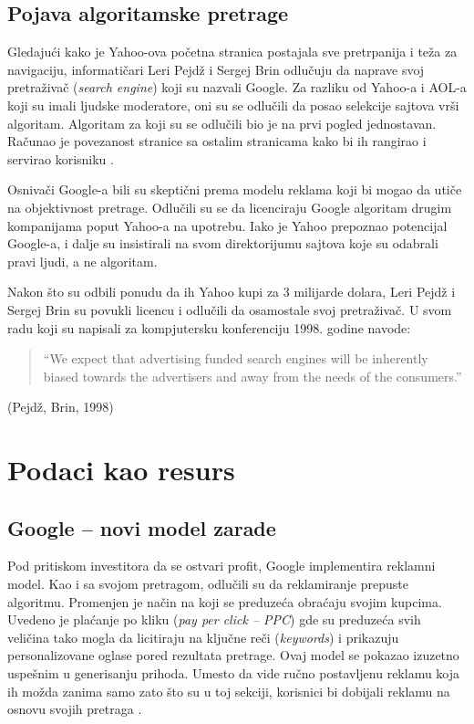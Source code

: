 \documentclass[12pt,a4paper]{article}
\begin{document}
\subsection{\textbf{Pojava algoritamske pretrage}}

Gledajući kako je Yahoo-ova početna stranica postajala sve pretrpanija i teža za navigaciju, informatičari Leri Pejdž i Sergej Brin odlučuju da naprave svoj pretraživač (\textit{search engine}) koji su nazvali Google. Za razliku od Yahoo-a i AOL-a koji su imali ljudske moderatore, oni su se odlučili da posao selekcije sajtova vrši algoritam. Algoritam za koji su se odlučili bio je na prvi pogled jednostavan. Računao je povezanost stranice sa ostalim stranicama kako bi ih rangirao i servirao korisniku \cite{google_marketing}.

Osnivači Google-a bili su skeptični prema modelu reklama koji bi mogao da utiče na objektivnost pretrage. Odlučili su se da licenciraju Google algoritam drugim kompanijama poput Yahoo-a na upotrebu. Iako je Yahoo prepoznao potencijal Google-a, i dalje su insistirali na svom direktorijumu sajtova koje su odabrali pravi ljudi, a ne algoritam.

Nakon što su odbili ponudu da ih Yahoo kupi za 3 milijarde dolara, Leri Pejdž i Sergej Brin su povukli licencu i odlučili da osamostale svoj pretraživač. U svom radu koji su napisali za kompjutersku konferenciju 1998. godine \cite{google_anatomy} navode:

\begin{quote}
``We expect that advertising funded search engines will be inherently biased towards the advertisers and away from the needs of the consumers.''
\end{quote}
\hfill (Pejdž, Brin, 1998)

\newpage

\section{Podaci kao resurs}
\subsection{\textbf{Google – novi model zarade}}

Pod pritiskom investitora da se ostvari profit, Google implementira reklamni model. Kao i sa svojom pretragom, odlučili su da reklamiranje prepuste algoritmu. Promenjen je način na koji se preduzeća obraćaju svojim kupcima. Uvedeno je plaćanje po kliku (\textit{pay per click – PPC}) gde su preduzeća svih veličina tako mogla da licitiraju na ključne reči (\textit{keywords}) i prikazuju personalizovane oglase pored rezultata pretrage. Ovaj model se pokazao izuzetno uspešnim u generisanju prihoda. Umesto da vide ručno postavljenu reklamu koja ih možda zanima samo zato što su u toj sekciji, korisnici bi dobijali reklamu na osnovu svojih pretraga \cite{google_marketing}.
\end{document}
